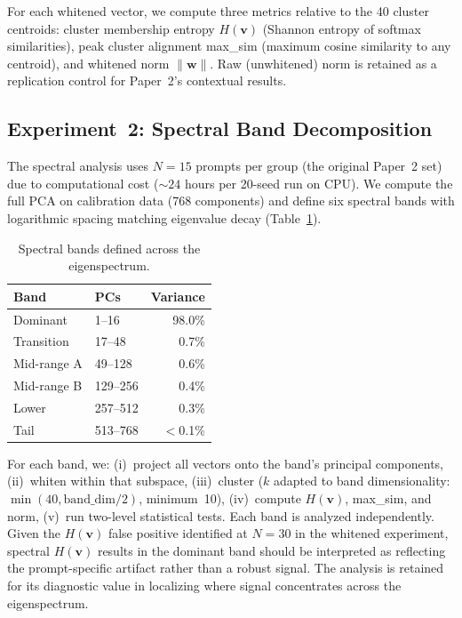 \documentclass[11pt]{article}
\newcommand{\Hv}{H(\mathbf{v})}
\newcommand{\wvec}{\mathbf{w}}
\begin{document}
For each whitened vector, we compute three metrics relative to the 40 cluster centroids: cluster membership entropy $\Hv$ (Shannon entropy of softmax similarities), peak cluster alignment max\_sim (maximum cosine similarity to any centroid), and whitened norm $\|\wvec\|$. Raw (unwhitened) norm is retained as a replication control for Paper~2's contextual results.

\subsection{Experiment~2: Spectral Band Decomposition}

The spectral analysis uses $N = 15$ prompts per group (the original Paper~2 set) due to computational cost (${\sim}24$ hours per 20-seed run on CPU). We compute the full PCA on calibration data (768 components) and define six spectral bands with logarithmic spacing matching eigenvalue decay (Table~\ref{tab:bands}).

\begin{table}[h]
\centering
\scriptsize
\setlength{\tabcolsep}{20pt}
\begin{tabular}{llr}
\toprule
\textbf{Band} & \textbf{PCs} & \textbf{Variance} \\
\midrule
Dominant    & 1--16    & 98.0\% \\
Transition  & 17--48   & 0.7\% \\
Mid-range A & 49--128  & 0.6\% \\
Mid-range B & 129--256 & 0.4\% \\
Lower       & 257--512 & 0.3\% \\
Tail        & 513--768 & $<$0.1\% \\
\bottomrule
\end{tabular}
\caption{Spectral bands defined across the eigenspectrum.}
\label{tab:bands}
\end{table}

For each band, we: (i)~project all vectors onto the band's principal components, (ii)~whiten within that subspace, (iii)~cluster ($k$ adapted to band dimensionality: $\min(40, \text{band\_dim}/2)$, minimum~10), (iv)~compute $\Hv$, max\_sim, and norm, (v)~run two-level statistical tests. Each band is analyzed independently. Given the $\Hv$ false positive identified at $N = 30$ in the whitened experiment, spectral $\Hv$ results in the dominant band should be interpreted as reflecting the prompt-specific artifact rather than a robust signal. The analysis is retained for its diagnostic value in localizing where signal concentrates across the eigenspectrum.
\end{document}
